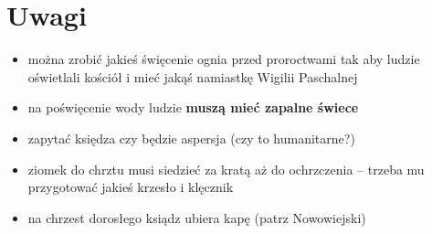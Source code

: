 \color{red}

\section{Uwagi}
\begin{itemize}
      \item można zrobić jakieś święcenie ognia przed proroctwami tak aby ludzie
            oświetlali kościół i mieć jakąś namiastkę Wigilii Paschalnej
      \item na poświęcenie wody ludzie \textbf{muszą mieć zapalne świece}
      \item zapytać księdza czy będzie aspersja (czy to humanitarne?)
      \item ziomek do chrztu musi siedzieć za kratą aż do ochrzczenia -- trzeba
            mu przygotować jakieś krzesło i klęcznik
      \item na chrzest dorosłego ksiądz ubiera kapę (patrz Nowowiejski)
\end{itemize}